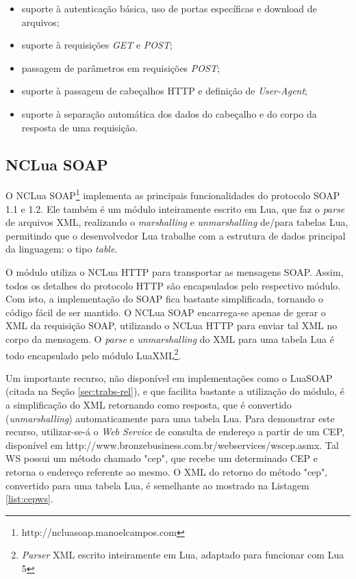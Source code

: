 \begin{itemize}
  \item suporte à autenticação básica, uso de portas específicas e download de arquivos;
  \item suporte à requisições \textit{GET} e \textit{POST};
  \item passagem de parâmetros em requisições \textit{POST};
  \item suporte à passagem de cabeçalhos HTTP e definição de \textit{User-Agent};
  \item suporte à separação automática dos dados do cabeçalho e do corpo da resposta de uma requisição.
\end{itemize}

\subsection{NCLua SOAP} \label{sec:ncluasoap}
O NCLua SOAP\footnote{http://ncluasoap.manoelcampos.com} implementa as principais funcionalidades do protocolo SOAP 1.1 e 1.2. 
Ele também é um módulo inteiramente
escrito em Lua, que faz o \textit{parse} de arquivos XML, 
realizando o \textit{marshalling} e \textit{unmarshalling} de/para tabelas Lua, permitindo que o desenvolvedor Lua
trabalhe com a estrutura de dados principal da linguagem: o tipo \textit{table}.

O módulo utiliza o NCLua HTTP para transportar as mensagens SOAP. Assim, todos os detalhes do protocolo HTTP são 
encapsulados pelo respectivo módulo. Com isto, a implementação do SOAP fica bastante simplificada, tornando o código
fácil de ser mantido. O NCLua SOAP encarrega-se apenas de gerar o XML da requisição SOAP, utilizando
o NCLua HTTP para enviar tal XML no corpo da mensagem. O \textit{parse} e \textit{unmarshalling} do XML para uma tabela Lua
é todo encapsulado pelo módulo LuaXML\footnote{\textit{Parser} XML escrito inteiramente em Lua, adaptado para funcionar com Lua 5}. 

Um importante recurso, não disponível em implementações como o LuaSOAP (citada na Seção \ref{sec:trabs-rel}),
e que facilita bastante a utilização do módulo, é a simplificação 
do XML retornando como resposta, que é convertido (\textit{unmarshalling}) automaticamente para uma tabela Lua.
Para demonstrar este recurso, utilizar-se-á o \textit{Web Service} de consulta de endereço a partir de um CEP,
disponível em http://www.bronzebusiness.com.br/webservices/wscep.asmx. Tal WS possui um método chamado "cep",
que recebe um determinado CEP e retorna o endereço referente ao mesmo.
O XML do retorno do método "cep", convertido para uma tabela Lua, é semelhante ao mostrado na Listagem \ref{list:cepws}.

